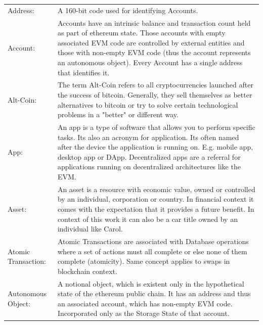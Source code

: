 \begin{center}
	\begin{tabular}{ p{4cm} p{8cm} } 
		Address: & A 160-bit code used for identifying Accounts.  \\ 
		Account: & Accounts have an intrinsic balance and transaction count held as part of ethereum state. Those accounts with empty associated \ac{EVM} code are controlled by external entities and those with non-empty \ac{EVM} code (thus the account represents an autonomous object). Every Account has a single address that identifies it. \\
		Alt-Coin: & The term Alt-Coin refers to all cryptocurrencies launched after the success of bitcoin. Generally, they sell themselves as better alternatives to bitcoin or try to solve certain technological problems in a "better" or different way. \\
		App: & An app is a type of software that allows you to perform specific tasks. Its also an acronym for application. Its often named after the device the application is running on. E.g. mobile app, desktop app or \ac{DApp}. Decentralized apps are a referral for applications running on decentralized architectures like the \ac{EVM}. \\
		Asset: & An asset is a resource with economic value, owned or controlled by an individual, corporation or country. In financial context it comes with the expectation that it provides a future benefit. In context of this work it can also be a car title owned by an individual like Carol.\\
		Atomic Transaction: & Atomic Transactions are associated with Database operations where a set of actions must all complete or else none of them complete (atomicity). Same concept applies to swaps in blockchain context. \\
		Autonomous Object: & A notional object, which is existent only in the hypothetical state of the ethereum public chain. It has an address and thus an associated account, which has non-empty \ac{EVM} code. Incorporated only as the Storage State of that account. \\
	\end{tabular}
\end{center}


\clearpage

